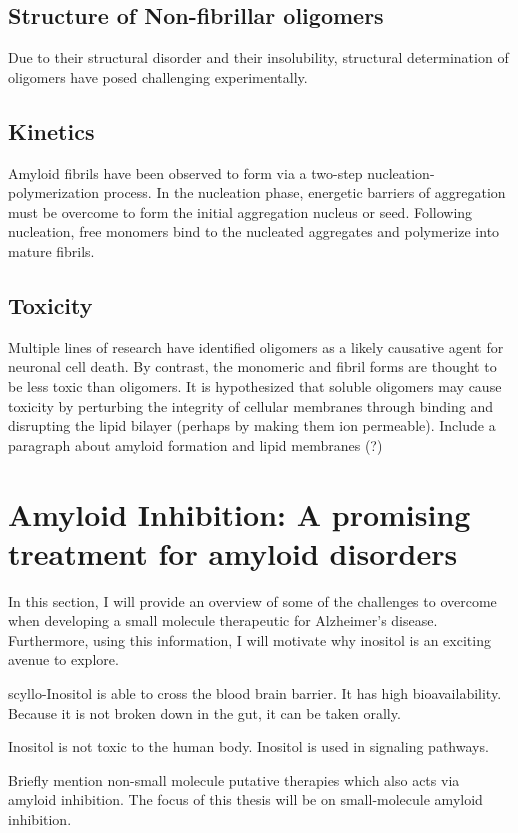   \subsection{Structure of Non-fibrillar oligomers}
   Due to their structural disorder and their insolubility, structural determination of oligomers have posed challenging experimentally.
	
  \subsection{Kinetics}
  Amyloid fibrils have been observed to form via a two-step nucleation-polymerization process. In the nucleation phase, energetic barriers of aggregation must be overcome to form the initial aggregation nucleus or seed.  Following nucleation, free monomers bind to the nucleated aggregates and polymerize into mature fibrils.\cite{Murphy:2002fe}
    
  \subsection{Toxicity}
  \begin{outline}
  	\1 Multiple lines of research have identified oligomers as a likely causative agent for neuronal cell death. By contrast, the monomeric and fibril forms are thought to be less toxic than oligomers. It is hypothesized that soluble oligomers may cause toxicity by perturbing the integrity of cellular membranes through binding and disrupting the lipid bilayer (perhaps by making them ion permeable). \cite{Walsh:2007fu}
  	\1 Include a paragraph about amyloid formation and lipid membranes (?)
  \end{outline}


\section{Amyloid Inhibition: A promising treatment for amyloid disorders}
\begin{outline}
	\1 In this section, I will provide an overview of some of the challenges to overcome when developing a small molecule therapeutic for Alzheimer's disease.  Furthermore, using this information, I will motivate why inositol is an exciting avenue to explore.
	
	  \2 scyllo-Inositol is able to cross the blood brain barrier. It has high bioavailability. Because it is not broken down in the gut, it can be taken orally.
	  
	  \2 Inositol is not toxic to the human body.  Inositol is used in signaling pathways.

	\1 Briefly mention non-small molecule putative therapies which also acts via amyloid inhibition. The focus of this thesis will be on small-molecule amyloid inhibition.
\end{outline}


